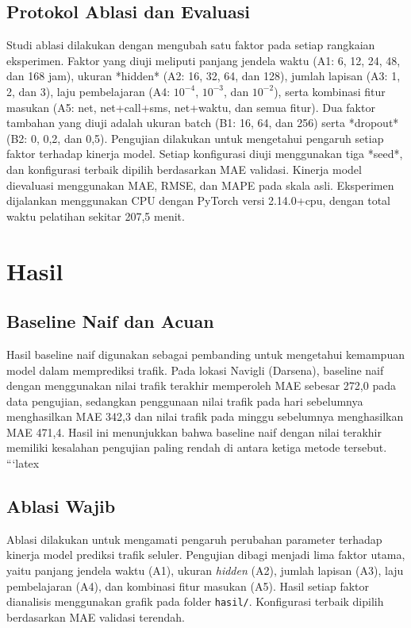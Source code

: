 \documentclass[conference,a4paper]{IEEEtran}
\begin{document}
\subsection{Protokol Ablasi dan Evaluasi}
Studi ablasi dilakukan dengan mengubah satu faktor pada setiap rangkaian eksperimen. Faktor yang diuji meliputi panjang jendela waktu (A1: 6, 12, 24, 48, dan 168 jam), ukuran *hidden* (A2: 16, 32, 64, dan 128), jumlah lapisan (A3: 1, 2, dan 3), laju pembelajaran (A4: \(10^{-4}\), \(10^{-3}\), dan \(10^{-2}\)), serta kombinasi fitur masukan (A5: net, net+call+sms, net+waktu, dan semua fitur). Dua faktor tambahan yang diuji adalah ukuran batch (B1: 16, 64, dan 256) serta *dropout* (B2: 0, 0,2, dan 0,5). Pengujian dilakukan untuk mengetahui pengaruh setiap faktor terhadap kinerja model. Setiap konfigurasi diuji menggunakan tiga *seed*, dan konfigurasi terbaik dipilih berdasarkan MAE validasi. Kinerja model dievaluasi menggunakan MAE, RMSE, dan MAPE pada skala asli. Eksperimen dijalankan menggunakan CPU dengan PyTorch versi 2.14.0+cpu, dengan total waktu pelatihan sekitar 207,5 menit.
\section{Hasil}

\subsection{Baseline Naif dan Acuan}
Hasil baseline naif digunakan sebagai pembanding untuk mengetahui kemampuan model dalam memprediksi trafik. Pada lokasi Navigli (Darsena), baseline naif dengan menggunakan nilai trafik terakhir memperoleh MAE sebesar 272,0 pada data pengujian, sedangkan penggunaan nilai trafik pada hari sebelumnya menghasilkan MAE 342,3 dan nilai trafik pada minggu sebelumnya menghasilkan MAE 471,4. Hasil ini menunjukkan bahwa baseline naif dengan nilai terakhir memiliki kesalahan pengujian paling rendah di antara ketiga metode tersebut.
```latex
\subsection{Ablasi Wajib}

Ablasi dilakukan untuk mengamati pengaruh perubahan parameter terhadap kinerja model prediksi trafik seluler. Pengujian dibagi menjadi lima faktor utama, yaitu panjang jendela waktu (A1), ukuran \textit{hidden} (A2), jumlah lapisan (A3), laju pembelajaran (A4), dan kombinasi fitur masukan (A5). Hasil setiap faktor dianalisis menggunakan grafik pada folder \texttt{hasil/}. Konfigurasi terbaik dipilih berdasarkan MAE validasi terendah.
\end{document}
